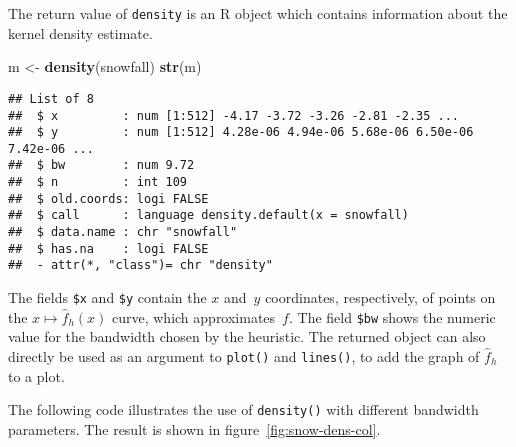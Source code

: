 \documentclass[
  a4paper,
]{article}
\newenvironment{Shaded}{\begin{snugshade}}{\end{snugshade}}
\newcommand{\CommentTok}[1]{\textcolor[rgb]{0.56,0.35,0.01}{\textit{#1}}}
\newcommand{\FunctionTok}[1]{\textcolor[rgb]{0.13,0.29,0.53}{\textbf{#1}}}
\newcommand{\NormalTok}[1]{#1}
\newcommand{\OtherTok}[1]{\textcolor[rgb]{0.56,0.35,0.01}{#1}}
\newcommand{\SpecialCharTok}[1]{\textcolor[rgb]{0.81,0.36,0.00}{\textbf{#1}}}
\newcommand{\StringTok}[1]{\textcolor[rgb]{0.31,0.60,0.02}{#1}}
\theoremstyle{definition}
\theoremstyle{definition}
\theoremstyle{definition}
\theoremstyle{definition}
\theoremstyle{remark}
\begin{document}
\begin{Shaded}
\end{Shaded}

The return value of \texttt{density} is an R object which contains information
about the kernel density estimate.

\begin{Shaded}
\begin{Highlighting}[]
\NormalTok{m }\OtherTok{\textless{}{-}} \FunctionTok{density}\NormalTok{(snowfall)}
\FunctionTok{str}\NormalTok{(m)}
\end{Highlighting}
\end{Shaded}

\begin{verbatim}
## List of 8
##  $ x         : num [1:512] -4.17 -3.72 -3.26 -2.81 -2.35 ...
##  $ y         : num [1:512] 4.28e-06 4.94e-06 5.68e-06 6.50e-06 7.42e-06 ...
##  $ bw        : num 9.72
##  $ n         : int 109
##  $ old.coords: logi FALSE
##  $ call      : language density.default(x = snowfall)
##  $ data.name : chr "snowfall"
##  $ has.na    : logi FALSE
##  - attr(*, "class")= chr "density"
\end{verbatim}

The fields \texttt{\$x} and \texttt{\$y} contain the \(x\) and~\(y\) coordinates, respectively,
of points on the \(x \mapsto \hat f_h(x)\) curve, which approximates~\(f\).
The field \texttt{\$bw} shows the numeric value for the bandwidth chosen by
the heuristic. The returned object can also directly be used
as an argument to \texttt{plot()} and \texttt{lines()}, to add the graph of \(\hat f_h\)
to a plot.

The following code illustrates the use of \texttt{density()} with different bandwidth
parameters. The result is shown in figure~\ref{fig:snow-dens-col}.
\end{document}
